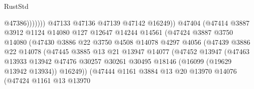 \begin{lexlean}{RustStd}
\begin{coremodule}
                                              @47386)))))))
                                @47133
                                @47136
                                @47139
                                @47142
                                @16249))
                            @47404
                            (@47414
                              @3887
                              @3912
                              @1124
                              @14080
                              @127
                              @12647
                              @14244
                              @14561
                              (@47424
                                @3887
                                @3750
                                @14080
                                (@47430
                                  @3886
                                  @22
                                  @3750
                                  @4508
                                  @14078
                                  @4297
                                  @4056
                                  (@47439
                                    @3886
                                    @22
                                    @14078
                                    (@47445
                                      @3885
                                      @13
                                      @21
                                      @13947
                                      @14077
                                      (@47452
                                        @13947
                                        (@47463
                                          @13933
                                          @13942
                                          @47476
                                          @30257
                                          @30261
                                          @30495
                                          @18146
                                          (@16099 (@19629 @13942 @13934))
                                          @16249))
                                      (@47444
                                        @1161
                                        @3884
                                        @13
                                        @20
                                        @13970
                                        @14076
                                        (@47424
                                          @1161
                                          @13
                                          @13970

\end{coremodule}
\end{lexlean}
